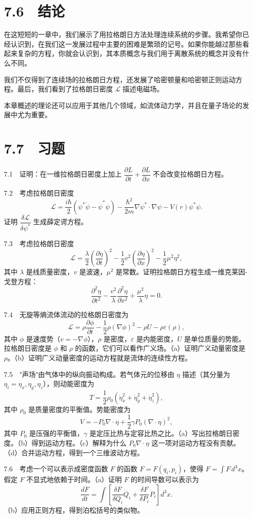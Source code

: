 \section*{7.6　结论}

在这短短的一章中，我们展示了用拉格朗日方法处理连续系统的步骤。我希望你已经认识到，在我们这一发展过程中主要的困难是繁琐的记号。如果你能越过那些看起来复杂的方程，你就会认识到，其本质概念与我们用于离散系统的概念并没有什么不同。

我们不仅得到了连续场的拉格朗日方程，还发展了哈密顿量和哈密顿正则运动方程。最后，我们看到了拉格朗日密度 $\mathcal{L}$ 描述电磁场。

本章概述的理论还可以应用于其他几个领域，如流体动力学，并且在量子场论的发展中尤为重要。

\section*{7.7　习题}

7.1　证明：在一维拉格朗日密度上加上 $\dfrac{\partial L}{\partial t} + \dfrac{\partial L}{\partial x}$ 不会改变拉格朗日方程。

7.2　考虑拉格朗日密度
$$
\mathcal{L} = \frac{i\hbar}{2}(\psi^*\dot{\psi} - \dot{\psi}^*\psi) - \frac{\hbar^2}{2m}\nabla\psi^*\cdot\nabla\psi - V(r)\psi^*\psi.
$$
证明 $\dfrac{\delta\mathcal{L}}{\delta\psi^*}$ 生成薛定谔方程。

7.3　考虑拉格朗日密度
$$
\mathcal{L} = \frac{\lambda}{2}\left(\frac{\partial\eta}{\partial t}\right)^2 - \frac{1}{2}v^2\left(\frac{\partial\eta}{\partial x}\right)^2 - \frac{1}{2}\mu^2\eta^2,
$$
其中 $\lambda$ 是线质量密度，$v$ 是波速，$\mu^2$ 是常数。证明拉格朗日方程生成一维克莱因-戈登方程：
$$
\frac{\partial^2\eta}{\partial t^2} - \frac{v^2}{\lambda}\frac{\partial^2\eta}{\partial x^2} + \frac{\mu^2}{\lambda}\eta = 0.
$$

7.4　无旋等熵流体流动的拉格朗日密度为
$$
\mathcal{L} = \rho\frac{\partial\phi}{\partial t} - \frac{1}{2}\rho(\nabla\phi)^2 - \rho U - \rho\varepsilon(\rho),
$$
其中 $\phi$ 是速度势（$v = -\nabla\phi$），$\rho$ 是密度，$\varepsilon$ 是内能密度，$U$ 是单位质量的势能。拉格朗日密度是 $\phi$ 和 $\rho$ 的函数，它们可以看作广义场。（a）证明广义动量密度是 $\rho$。（b）证明广义动量密度的运动方程就是流体的连续性方程。

7.5　"声场"由气体中的纵向振动构成。若气体元的位移由 $\eta$ 描述（其分量为 $\eta_i = \eta_x, \eta_y, \eta_z$），则动能密度为
$$
T = \frac{1}{2}\rho_0(\dot{\eta}_x^2 + \dot{\eta}_y^2 + \dot{\eta}_z^2),
$$
其中 $\rho_0$ 是质量密度的平衡值。势能密度为
$$
V = -P_0\nabla\cdot\eta + \frac{1}{2}\gamma P_0(\nabla\cdot\eta)^2,
$$
其中 $P_0$ 是压强的平衡值，$\gamma$ 是定压比热与定容比热之比。（a）写出拉格朗日密度。（b）得到运动方程。（c）解释为什么 $P_0\nabla\cdot\eta$ 这一项对运动方程没有贡献。（d）合并运动方程，得到一个三维波动方程。

7.6　考虑一个可以表示成密度函数 $F$ 的函数 $F = F(q_i, p_i)$，使得 $F = \int F\,d^3x$。假定 $F$ 不显式地依赖于时间。（a）证明 $F$ 的时间导数可以表示为
$$
\frac{dF}{dt} = \int\left[\frac{\delta F}{\delta Q_i}\dot{Q}_i + \frac{\delta F}{\delta P_i}\dot{P}_i\right]d^3x.
$$
（b）应用正则方程，得到泊松括号的类似物。
